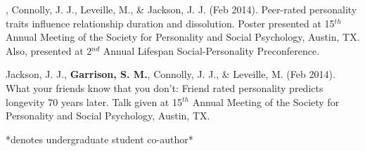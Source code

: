 \item\meb, Connolly, J. J., Leveille, M., \& Jackson, J. J. (Feb 2014). Peer-rated personality traits influence relationship duration and dissolution. Poster presented at 15$^{th}$ Annual Meeting of the Society for Personality and Social Psychology, Austin, TX. Also, presented at 2$^{nd}$ Annual Lifespan Social-Personality  Preconference.
\item Jackson, J. J., \textbf{Garrison, S. M.}, Connolly, J. J., \& Leveille, M. (Feb 2014). What your friends know that you don't: Friend rated personality predicts longevity 70 years later. Talk given at 15$^{th}$ Annual Meeting of the Society for Personality and  Social Psychology, Austin, TX.

\vspace{-2mm}\begin{center}\footnotesize{*denotes undergraduate student co-author*}\end{center} \vspace{-3mm}



